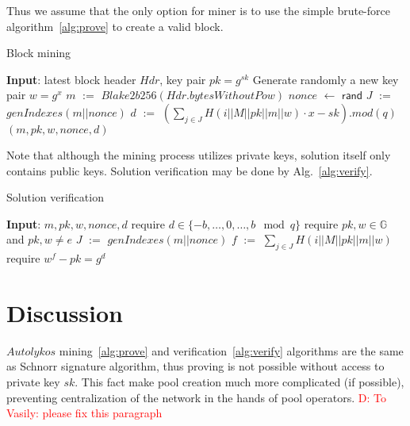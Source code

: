 \documentclass[]{article}
\newcommand{\dnote}[1]{\textcolor{red}{D: {#1}}}
\newcommand{\Name}{$Autolykos$}
\def\Let#1#2{\State #1 $:=$ #2}
\def\LetRnd#1#2{\State #1 $\gets$ #2}
\begin{document}
    Thus we assume that the only option for miner is to use the simple brute-force algorithm~\ref{alg:prove} to
    create a valid block.

    \begin{algorithm}[H]
        \caption{Block mining}
        \label{alg:prove}
        \begin{algorithmic}[1]
            \State \textbf{Input}: latest block header $Hdr$, key pair $pk=g^{sk}$
            \State Generate randomly a new key pair $w=g^x$
            \Let{$m$}{$Blake2b256(Hdr.bytesWithoutPow)$}
            \LetRnd{$nonce$}{$\mathsf{rand}$}
            \Let{$J$}{$genIndexes(m||nonce)$}
            \Let{$d$}{$(\sum_{j \in J}{H(i||M||pk||m||w)} \cdot x - sk).mod(q)$}
            \State \Return $(m,pk,w,nonce,d)$
            \EndIf
            \EndWhile
        \end{algorithmic}
    \end{algorithm}

    Note that although the mining process utilizes private keys, solution itself
    only contains public keys. Solution verification may be done by Alg.~\ref{alg:verify}.

    \begin{algorithm}[H]
        \caption{Solution verification}
        \label{alg:verify}
        \begin{algorithmic}[1]
            \State \textbf{Input}: $m,pk,w,nonce,d$
            \State require $d\in\{-b,\dots,0,\dots, b\mod q\}$
            \State require $pk,w\in \mathbb{G}$ and $pk,w \ne e$
            \Let{$J$}{$genIndexes(m||nonce)$}
            \Let{$f$}{$\sum_{j \in J} H(i||M||pk||m||w)$}
            \State require $w^f - pk = g^d$
        \end{algorithmic}
    \end{algorithm}

    \section{Discussion}
    \label{discussion}

    \Name{} mining~\ref{alg:prove} and verification~\ref{alg:verify} algorithms are
    the same as Schnorr signature algorithm, thus proving is not possible without access
    to private key $sk$. This fact make pool creation much more complicated (if possible),
    preventing centralization of the network in the hands of pool operators. \dnote{To Vasily: please fix this paragraph}
\end{document}
